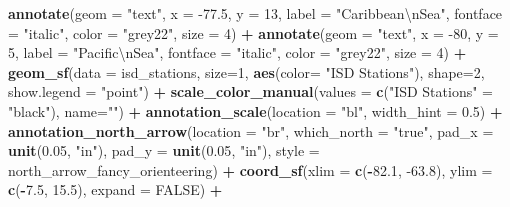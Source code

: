 \documentclass[12pt,twoside]{reedthesis}
\newenvironment{Shaded}{\begin{snugshade}}{\end{snugshade}}
\newcommand{\CharTok}[1]{\textcolor[rgb]{0.31,0.60,0.02}{#1}}
\newcommand{\DataTypeTok}[1]{\textcolor[rgb]{0.13,0.29,0.53}{#1}}
\newcommand{\DecValTok}[1]{\textcolor[rgb]{0.00,0.00,0.81}{#1}}
\newcommand{\FloatTok}[1]{\textcolor[rgb]{0.00,0.00,0.81}{#1}}
\newcommand{\KeywordTok}[1]{\textcolor[rgb]{0.13,0.29,0.53}{\textbf{#1}}}
\newcommand{\NormalTok}[1]{#1}
\newcommand{\OperatorTok}[1]{\textcolor[rgb]{0.81,0.36,0.00}{\textbf{#1}}}
\newcommand{\OtherTok}[1]{\textcolor[rgb]{0.56,0.35,0.01}{#1}}
\newcommand{\StringTok}[1]{\textcolor[rgb]{0.31,0.60,0.02}{#1}}
\begin{document}
\begin{Shaded}
\begin{Highlighting}[]
\StringTok{  }\KeywordTok{annotate}\NormalTok{(}\DataTypeTok{geom =} \StringTok{"text"}\NormalTok{, }\DataTypeTok{x =} \FloatTok{-77.5}\NormalTok{, }\DataTypeTok{y =} \DecValTok{13}\NormalTok{, }\DataTypeTok{label =} \StringTok{"Caribbean}\CharTok{\textbackslash{}n}\StringTok{Sea"}\NormalTok{, }\DataTypeTok{fontface =} \StringTok{"italic"}\NormalTok{, }\DataTypeTok{color =} \StringTok{"grey22"}\NormalTok{, }\DataTypeTok{size =} \DecValTok{4}\NormalTok{) }\OperatorTok{+}\StringTok{ }
\StringTok{  }\KeywordTok{annotate}\NormalTok{(}\DataTypeTok{geom =} \StringTok{"text"}\NormalTok{, }\DataTypeTok{x =} \DecValTok{-80}\NormalTok{, }\DataTypeTok{y =} \DecValTok{5}\NormalTok{, }\DataTypeTok{label =} \StringTok{"Pacific}\CharTok{\textbackslash{}n}\StringTok{Sea"}\NormalTok{, }\DataTypeTok{fontface =} \StringTok{"italic"}\NormalTok{, }\DataTypeTok{color =} \StringTok{"grey22"}\NormalTok{, }\DataTypeTok{size =} \DecValTok{4}\NormalTok{) }\OperatorTok{+}
\StringTok{  }\KeywordTok{geom_sf}\NormalTok{(}\DataTypeTok{data =}\NormalTok{ isd_stations, }\DataTypeTok{size=}\DecValTok{1}\NormalTok{, }\KeywordTok{aes}\NormalTok{(}\DataTypeTok{color=} \StringTok{"ISD Stations"}\NormalTok{), }\DataTypeTok{shape=}\DecValTok{2}\NormalTok{, }\DataTypeTok{show.legend =} \StringTok{"point"}\NormalTok{) }\OperatorTok{+}\StringTok{ }
\StringTok{  }\KeywordTok{scale_color_manual}\NormalTok{(}\DataTypeTok{values =} \KeywordTok{c}\NormalTok{(}\StringTok{"ISD Stations"}\NormalTok{ =}\StringTok{ "black"}\NormalTok{), }\DataTypeTok{name=}\StringTok{""}\NormalTok{) }\OperatorTok{+}
\StringTok{  }\KeywordTok{annotation_scale}\NormalTok{(}\DataTypeTok{location =} \StringTok{"bl"}\NormalTok{, }\DataTypeTok{width_hint =} \FloatTok{0.5}\NormalTok{) }\OperatorTok{+}\StringTok{ }
\StringTok{  }\KeywordTok{annotation_north_arrow}\NormalTok{(}\DataTypeTok{location =} \StringTok{"br"}\NormalTok{, }\DataTypeTok{which_north =} \StringTok{"true"}\NormalTok{, }\DataTypeTok{pad_x =} \KeywordTok{unit}\NormalTok{(}\FloatTok{0.05}\NormalTok{, }\StringTok{"in"}\NormalTok{), }\DataTypeTok{pad_y =} \KeywordTok{unit}\NormalTok{(}\FloatTok{0.05}\NormalTok{, }\StringTok{"in"}\NormalTok{), }
   \DataTypeTok{style =}\NormalTok{ north_arrow_fancy_orienteering) }\OperatorTok{+}\StringTok{ }
\StringTok{  }\KeywordTok{coord_sf}\NormalTok{(}\DataTypeTok{xlim =} \KeywordTok{c}\NormalTok{(}\OperatorTok{-}\FloatTok{82.1}\NormalTok{, }\FloatTok{-63.8}\NormalTok{), }\DataTypeTok{ylim =} \KeywordTok{c}\NormalTok{(}\OperatorTok{-}\FloatTok{7.5}\NormalTok{, }\FloatTok{15.5}\NormalTok{), }\DataTypeTok{expand =} \OtherTok{FALSE}\NormalTok{) }\OperatorTok{+}

\end{Highlighting}
\end{Shaded}
\end{document}
